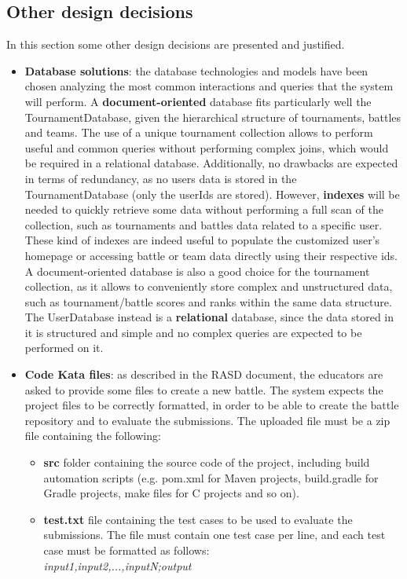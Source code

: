 \subsection{Other design decisions}
In this section some other design decisions are presented and justified.
\begin{itemize}
    \item \textbf{Database solutions}: the database technologies and models have been chosen analyzing the most common interactions and queries that the system will perform. 
    A \textbf{document-oriented} database fits particularly well the TournamentDatabase, given the hierarchical structure of tournaments, battles and teams. The use of a unique tournament collection allows to perform useful and common queries without performing complex joins, which would be required in a relational database.
    Additionally, no drawbacks are expected in terms of redundancy, as no users data is stored in the TournamentDatabase (only the userIds are stored).
    However, \textbf{indexes} will be needed to quickly retrieve some data without performing a full scan of the collection, such as tournaments and battles data related to a specific user. These kind of indexes are indeed useful to populate the customized user's homepage or accessing battle or team data directly using their respective ids.
    A document-oriented database is also a good choice for the tournament collection, as it allows to conveniently store complex and unstructured data, such as tournament/battle scores and ranks within the same data structure.
    The UserDatabase instead is a \textbf{relational} database, since the data stored in it is structured and simple and no complex queries are expected to be performed on it.
    \item \textbf{Code Kata files}: as described in the RASD document, the educators are asked to provide some files to create a new battle. The system expects the project files to be correctly formatted, in order to be able to create the battle repository and to evaluate the submissions.
    The uploaded file must be a zip file containing the following:
    \begin{itemize}
        \item \textbf{src} folder containing the source code of the project, including build automation scripts (e.g. pom.xml for Maven projects, build.gradle for Gradle projects, make files for C projects and so on). 
        \item \textbf{test.txt} file containing the test cases to be used to evaluate the submissions. The file must contain one test case per line, and each test case must be formatted as follows:\\
         \textit{input1,input2,...,inputN;output}
    \end{itemize}
\end{itemize}

